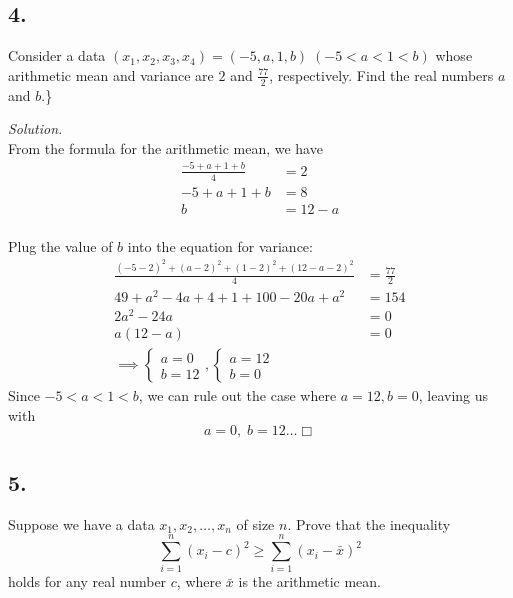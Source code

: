 \documentclass[
]{article}
\begin{document}
\hypertarget{section-3}{%
\subsection{4.}\label{section-3}}

Consider a data
\((x_1, x_2, x_3, x_4) = (-5, a, 1, b) \;(-5 < a < 1 < b)\) whose
arithmetic mean and variance are \(2\) and \(\frac{77}{2}\),
respectively. Find the real numbers \(a\) and \(b\).\}

\textit{Solution.}\\
From the formula for the arithmetic mean, we have \[\begin{aligned}
\frac{-5 + a + 1 + b}{4} &= 2 \\
-5 + a + 1 + b &= 8 \\
b &= 12 - a\\
\end{aligned}\]

Plug the value of \(b\) into the equation for variance:
\[\begin{aligned}
\frac{(-5 - 2)^2 + (a-2)^2 + (1-2)^2 + (12-a-2)^2}{4} &= \frac{77}{2}\\
49 + a^2 -4a + 4 + 1 + 100 - 20a + a^2 &= 154 \\
2a^2 - 24a &= 0 \\
a(12-a) &= 0 \\
\implies \begin{cases}a = 0 \\ b = 12 \end{cases}, \begin{cases} a = 12 \\ b = 0 \end{cases}&
\end{aligned}\] Since \(-5 < a < 1 < b\), we can rule out the case where
\(a = 12, b = 0\), leaving us with \[a = 0, \;b = 12\dots \Box\]

\hypertarget{section-4}{%
\subsection{5.}\label{section-4}}

Suppose we have a data \(x_1, x_2, \dots , x_n\) of size \(n\). Prove
that the inequality
\[\sum_{i=1}^n(x_i-c)^2 \ge \sum_{i=1}^n(x_i-\bar{x})^2\] holds for any
real number \(c\), where \(\bar{x}\) is the arithmetic mean.
\end{document}
